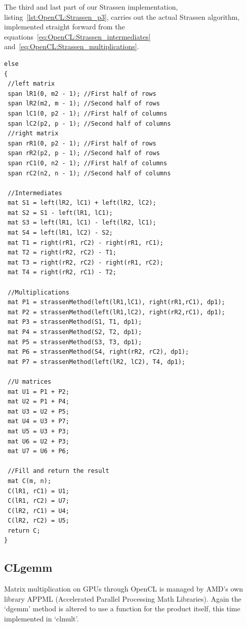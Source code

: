 The third and last part of our Strassen implementation, listing~\ref{lst:OpenCL:Strassen_p3}, carries out the actual Strassen algorithm, implemented straight forward from the equations~\eqref{eq:OpenCL:Strassen_intermediates} and~\eqref{eq:OpenCL:Strassen_multiplications}.
\begin{lstlisting}[float,label={lst:OpenCL:Strassen_p3},caption={Strassen p3. Continuation of listing~\ref{lst:OpenCL:Strassen_p2}.},name={strassen_complete}]
else
{
 //left matrix
 span lR1(0, m2 - 1); //First half of rows
 span lR2(m2, m - 1); //Second half of rows
 span lC1(0, p2 - 1); //First half of columns
 span lC2(p2, p - 1); //Second half of columns
 //right matrix
 span rR1(0, p2 - 1); //First half of rows
 span rR2(p2, p - 1); //Second half of rows
 span rC1(0, n2 - 1); //First half of columns
 span rC2(n2, n - 1); //Second half of columns

 //Intermediates
 mat S1 = left(lR2, lC1) + left(lR2, lC2);
 mat S2 = S1 - left(lR1, lC1);
 mat S3 = left(lR1, lC1) - left(lR2, lC1);
 mat S4 = left(lR1, lC2) - S2;
 mat T1 = right(rR1, rC2) - right(rR1, rC1);
 mat T2 = right(rR2, rC2) - T1;
 mat T3 = right(rR2, rC2) - right(rR1, rC2);
 mat T4 = right(rR2, rC1) - T2;

 //Multiplications
 mat P1 = strassenMethod(left(lR1,lC1), right(rR1,rC1), dp1);
 mat P2 = strassenMethod(left(lR1,lC2), right(rR2,rC1), dp1);
 mat P3 = strassenMethod(S1, T1, dp1);
 mat P4 = strassenMethod(S2, T2, dp1);
 mat P5 = strassenMethod(S3, T3, dp1);
 mat P6 = strassenMethod(S4, right(rR2, rC2), dp1);
 mat P7 = strassenMethod(left(lR2, lC2), T4, dp1);

 //U matrices
 mat U1 = P1 + P2;
 mat U2 = P1 + P4;
 mat U3 = U2 + P5;
 mat U4 = U3 + P7;
 mat U5 = U3 + P3;
 mat U6 = U2 + P3;
 mat U7 = U6 + P6;

 //Fill and return the result
 mat C(m, n);
 C(lR1, rC1) = U1;
 C(lR1, rC2) = U7;
 C(lR2, rC1) = U4;
 C(lR2, rC2) = U5;
 return C;
}
\end{lstlisting}







\subsection{CLgemm}
Matrix multiplication on GPUs through OpenCL is managed by AMD's own library APPML (Accelerated Parallel Processing Math Libraries).
Again the `dgemm' method is altered to use a function for the product itself, this time implemented in `clmult'.

